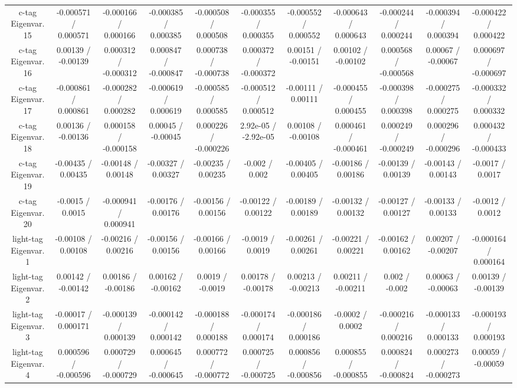 \begin{table}[htbp]
\begin{center}
\begin{tabular}{|c|c|c|c|c|c|c|c|c|c|c|}
  c-tag Eigenvar. 15 & -0.000571 / 0.000571 & -0.000166 / 0.000166 & -0.000385 / 0.000385 & -0.000508 / 0.000508 & -0.000355 / 0.000355 & -0.000552 / 0.000552 & -0.000643 / 0.000643 & -0.000244 / 0.000244 & -0.000394 / 0.000394 & -0.000422 / 0.000422 \\ 
  c-tag Eigenvar. 16 & 0.00139 / -0.00139 & 0.000312 / -0.000312 & 0.000847 / -0.000847 & 0.000738 / -0.000738 & 0.000372 / -0.000372 & 0.00151 / -0.00151 & 0.00102 / -0.00102 & 0.000568 / -0.000568 & 0.00067 / -0.00067 & 0.000697 / -0.000697 \\ 
  c-tag Eigenvar. 17 & -0.000861 / 0.000861 & -0.000282 / 0.000282 & -0.000619 / 0.000619 & -0.000585 / 0.000585 & -0.000512 / 0.000512 & -0.00111 / 0.00111 & -0.000455 / 0.000455 & -0.000398 / 0.000398 & -0.000275 / 0.000275 & -0.000332 / 0.000332 \\ 
  c-tag Eigenvar. 18 & 0.00136 / -0.00136 & 0.000158 / -0.000158 & 0.00045 / -0.00045 & 0.000226 / -0.000226 & 2.92e-05 / -2.92e-05 & 0.00108 / -0.00108 & 0.000461 / -0.000461 & 0.000249 / -0.000249 & 0.000296 / -0.000296 & 0.000432 / -0.000433 \\ 
  c-tag Eigenvar. 19 & -0.00435 / 0.00435 & -0.00148 / 0.00148 & -0.00327 / 0.00327 & -0.00235 / 0.00235 & -0.002 / 0.002 & -0.00405 / 0.00405 & -0.00186 / 0.00186 & -0.00139 / 0.00139 & -0.00143 / 0.00143 & -0.0017 / 0.0017 \\ 
  c-tag Eigenvar. 20 & -0.0015 / 0.0015 & -0.000941 / 0.000941 & -0.00176 / 0.00176 & -0.00156 / 0.00156 & -0.00122 / 0.00122 & -0.00189 / 0.00189 & -0.00132 / 0.00132 & -0.00127 / 0.00127 & -0.00133 / 0.00133 & -0.0012 / 0.0012 \\ 
  light-tag Eigenvar. 1 & -0.00108 / 0.00108 & -0.00216 / 0.00216 & -0.00156 / 0.00156 & -0.00166 / 0.00166 & -0.0019 / 0.0019 & -0.00261 / 0.00261 & -0.00221 / 0.00221 & -0.00162 / 0.00162 & 0.00207 / -0.00207 & -0.000164 / 0.000164 \\ 
  light-tag Eigenvar. 2 & 0.00142 / -0.00142 & 0.00186 / -0.00186 & 0.00162 / -0.00162 & 0.0019 / -0.0019 & 0.00178 / -0.00178 & 0.00213 / -0.00213 & 0.00211 / -0.00211 & 0.002 / -0.002 & 0.00063 / -0.00063 & 0.00139 / -0.00139 \\ 
  light-tag Eigenvar. 3 & -0.00017 / 0.000171 & -0.000139 / 0.000139 & -0.000142 / 0.000142 & -0.000188 / 0.000188 & -0.000174 / 0.000174 & -0.000186 / 0.000186 & -0.0002 / 0.0002 & -0.000216 / 0.000216 & -0.000133 / 0.000133 & -0.000193 / 0.000193 \\ 
  light-tag Eigenvar. 4 & 0.000596 / -0.000596 & 0.000729 / -0.000729 & 0.000645 / -0.000645 & 0.000772 / -0.000772 & 0.000725 / -0.000725 & 0.000856 / -0.000856 & 0.000855 / -0.000855 & 0.000824 / -0.000824 & 0.000273 / -0.000273 & 0.00059 / -0.00059 \\ 

\end{tabular}
\end{center}
\end{table}
